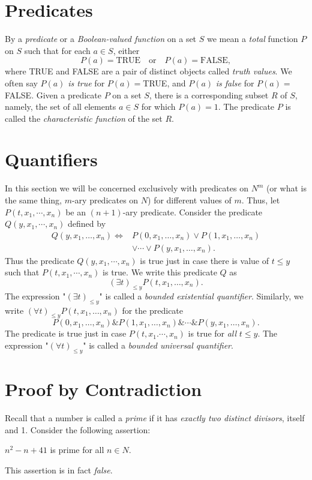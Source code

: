 \documentclass[12pt,a4paper,twoside,openany]{book}
\begin{document}
\section{Predicates}

By a \textit{predicate} or a \textit{Boolean-valued function} on a set $S$ we mean a \textit{total} function $P$ on $S$ such that for each $a\in S$, either $$P(a)=\mathrm{TRUE}\quad\mathrm{or}\quad P(a)=\mathrm{FALSE},$$ where TRUE and FALSE are a pair of distinct objects called \textit{truth values}. We often say $P(a)$ \textit{is true} for $P(a)=$TRUE, and $P(a)$ \textit{is false} for $P(a)=$FALSE. Given a predicate $P$ on a set $S$, there is a corresponding subset $R$ of $S$, namely, the set of all elements $a\in S$ for which $P(a)=1$. The predicate $P$ is called the \textit{characteristic function} of the set $R$.

\section{Quantifiers}

In this section we will be concerned exclusively with predicates on $N^m$ (or what is the same thing, $m$-ary predicates on $N$) for different values of $m$. Thus, let $P(t,x_1,\cdots,x_n)$ be an $(n+1)$-ary predicate. Consider the predicate $Q(y,x_1,\cdots,x_n)$ defined by $$\begin{aligned}Q(y,x_{1},\ldots,x_{n})\Leftrightarrow&P(0,x_{1},\ldots,x_{n})\vee P(1,x_{1},\ldots,x_{n})\\ &\vee\cdots\vee P(y,x_{1},\ldots,x_{n}).\end{aligned}$$ Thus the predicate $Q(y,x_1,\cdots,x_n)$ is true just in case there is value of $t\le y$ such that $P(t,x_1,\cdots,x_n)$ is true. We write this predicate $Q$ as $$(\exists t)_{\leq y}P(t,x_{1},\ldots,x_{n}).$$ The expression "$(\exists t)_{\leq y}$" is called a \textit{bounded existential quantifier}. Similarly, we write $(\forall t)_{\le y}P(t,x_1,\ldots,x_n)$ for the predicate $$P(0,x_1,\ldots,x_n)\&P(1,x_1,\ldots,x_n)\&\cdots\&P(y,x_1,\ldots,x_n).$$ The predicate is true just in case $P(t,x_1.\cdots,x_n)$ is true for \textit{all} $t\le y$. The expression "$(\forall t)_{\le y}$" is called a \textit{bounded universal quantifier}.

\section{Proof by Contradiction}

Recall that a number is called a \textit{prime} if it has \textit{exactly two distinct divisors}, itself and 1. Consider the following assertion:
\begin{center}
    $n^2-n+41$ is prime for all $n\in N$.
\end{center}
This assertion is in fact \textit{false}.
\end{document}
